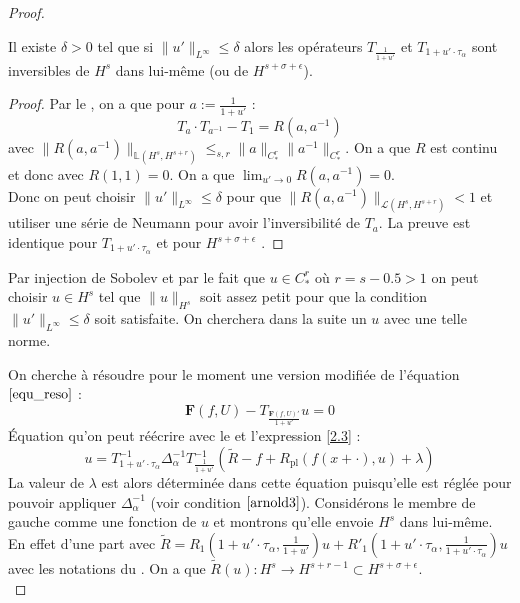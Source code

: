 \documentclass[11pt,a4paper]{article}
\begin{document}
\begin{proof}
\begin{lemma}\label{inversibilite} 
Il existe $\delta>0$ tel que si $\|u'\|_{L^\infty} \leq \delta $ alors les opérateurs $T_{\frac{1}{1+u'}}$ et $T_{1+u'\cdot \tau_\alpha}$ sont inversibles de $H^s$ dans lui-même (ou de $ H^{s+\sigma+\epsilon}$).
\end{lemma}
\begin{proof}
Par le , on a que pour $a:=\frac{1}{1+u'}$ :
\begin{equation*}
T_a\cdot T_{a^{-1}} -T_1=R(a,a^{-1})
\end{equation*}
avec $\|R(a,a^{-1})\|_{\mathbb{L}(H^s,H^{s+r})} \leq_{s,r} \|a\|_{C^r_*} \|a^{-1}\|_{C^r_*}$. On a que $R$ est continu et donc avec $ R(1,1)=0$. On a que $\lim_{u' \to 0} R(a,a^{-1})=0$. \\
Donc on peut choisir  $\|u'\|_{L^\infty} \leq \delta $  pour que $\|R(a,a^{-1})\|_{\mathcal{L}(H^s,H^{s+r})}<1 $ et utiliser une série de Neumann pour avoir l'inversibilité de $T_a$. La preuve est identique pour $T_{1+u'\cdot \tau_\alpha }$ et pour $ H^{s+\sigma +\epsilon}$ . 
\end{proof}
\begin{rmq}
Par injection de Sobolev et par le fait que $u \in C^r_*$ où $r=s-0.5>1$ on peut choisir  $u \in H^s$ tel que $\|u\|_{H^s}$ soit assez petit pour que la condition $\|u'\|_{L^\infty} \leq \delta $ soit satisfaite. On cherchera dans la suite un $u$ avec une telle norme.
\end{rmq}
On cherche à résoudre pour le moment une version modifiée de l'équation $\eqref{equ_reso}$ :
\begin{equation}\label{equ_reso2}
\mathbf{F}(f,U)-T_{\frac{\mathbf{F}(f,U)'}{1+u'}}u=0
\end{equation}
Équation qu'on peut réécrire avec le  et l'expression \eqref{2.3} :
\begin{equation}\label{equ_reso3}
u=T_{1+u' \cdot \tau_\alpha}^{-1} \Delta_\alpha^{-1} T_{\frac{1}{1+u'}}^{-1}(\tilde{R} -f +R_{\text{pl}}(f(x+\cdot),u) + \lambda)
\end{equation}
La valeur de $\lambda$ est alors déterminée dans cette équation puisqu'elle est réglée pour pouvoir appliquer $\Delta_\alpha^{-1}$ (voir condition $\eqref{arnold3}$).
Considérons le membre de gauche comme une fonction de $u$ et montrons qu'elle envoie $H^s$ dans lui-même.
En effet d'une part avec $\tilde{R}=R_1(1+u'\cdot \tau_\alpha,\frac{1}{1+u'})u +R'_1 ( 1+u' \cdot \tau_\alpha ,\frac{1}{1+u' \cdot \tau_\alpha})u$ avec les notations du . On a que $\tilde{R}(u) : H^s \to H^{s+r-1} \subset H^{s+\sigma +\epsilon}$. \\

\end{proof}
\end{document}
